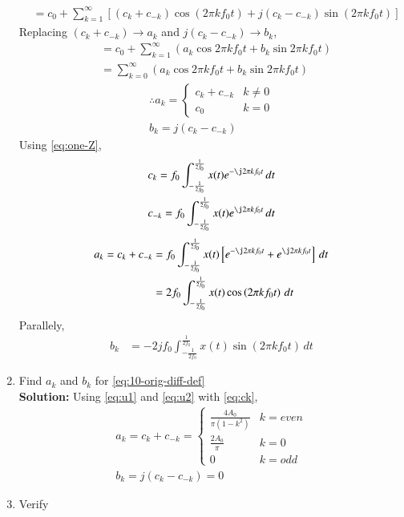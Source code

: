 \documentclass[journal,12pt,twocolumn]{IEEEtran}
\newcommand{\solution}{\noindent \textbf{Solution: }}
\providecommand{\brak}[1]{\ensuremath{\left(#1\right)}}
\providecommand{\sbrak}[1]{\ensuremath{\left[#1\right]}}
\numberwithin{equation}{section}
\renewcommand\thesection{\arabic{section}}
\begin{document}
\begin{enumerate}[label=\thesection.\arabic*,ref=\thesection.\theenumi]
\begin{align}
    &=c_0+\sum_{k = 1}^{\infty}\sbrak{\brak{c_k+c_{-k}}\cos\brak{2\pi kf_0 t}+j\brak{c_k-c_{-k}}\sin\brak{2\pi kf_0 t}}
    \end{align}
    Replacing $\brak{c_k+c_{-k}}\to a_k$ and $j\brak{c_k-c_{-k}} \to b_k$,
    \begin{align}
&=c_0+    \sum_{k = 1}^{\infty}\brak{a_k\cos{2\pi kf_0 t}+b_k\sin{2\pi kf_0 t}}\\
&=\sum_{k = 0}^{\infty}\brak{a_k\cos{2\pi kf_0 t}+b_k\sin{2\pi kf_0 t}}
    \end{align}
    \begin{align}
    \label{eq:u1}
    \therefore a_k=
    \begin{cases}
    c_k+c_{-k}&k\neq0
    \\
    c_0&k=0
    \end{cases}\\
    \label{eq:u2}
    b_k=j\brak{c_k-c_{-k}}
    \end{align}
    Using \eqref{eq:one-Z},
    \begin{align}
    c_k = f_0\int_{-\frac{1}{2f_0}}^{\frac{1}{2f_0}}x(t)e^{-\j2\pi kf_0 t}\, dt\\
    c_{-k} = f_0\int_{-\frac{1}{2f_0}}^{\frac{1}{2f_0}}x(t)e^{\j2\pi kf_0 t}\, dt\end{align}
    \begin{align}
    a_k=c_k+c_{-k}&= f_0\int_{-\frac{1}{2f_0}}^{\frac{1}{2f_0}}x(t)\sbrak{e^{-\j2\pi kf_0 t}+e^{\j2\pi kf_0 t}}\, dt\\
    &=2f_0\int_{-\frac{1}{2f_0}}^{\frac{1}{2f_0}}x(t)\cos\brak{2\pi kf_0t}\, dt
    \end{align}
    Parallely,
    \begin{align}
    b_k&=-2jf_0\int_{-\frac{1}{2f_0}}^{\frac{1}{2f_0}}x(t)\sin\brak{2\pi kf_0t}\, dt
    \end{align}
    \item Find $a_k$ and $b_k$ for 
        \eqref{eq:10-orig-diff-def}\\
        \solution
        Using \eqref{eq:u1} and \eqref{eq:u2} with \eqref{eq:ck},
    \begin{align}
    a_k=c_k+c_{-k}=\begin{cases}
\frac{4A_0}{\pi\brak{1-k^2}}&k=even
\\
\frac{2A_0}{\pi}&k=0
\\
0&k=odd
\end{cases}\\
b_k=j\brak{c_k-c_{-k}}=0
    \end{align}
    \item Verify 

\end{enumerate}
\end{document}
